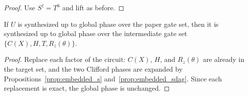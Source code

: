 \begin{proof}
  \leanok
  Use $S^\dagger = T^6$ and lift as before.
\end{proof}

\begin{theorem}
  \label{thm:clifford_rz_to_t_rz}
  \leanok
  If $U$ is synthesized up to global phase over the paper gate set, then it is
  synthesized up to global phase over the intermediate gate set
  $\{C(X), H, T, R_z(\theta)\}$.
\end{theorem}

\begin{proof}
  \leanok
  Replace each factor of the circuit: $C(X)$, $H$, and $R_z(\theta)$ are
  already in the target set, and the two Clifford phases are expanded by
  Propositions~\ref{prop:embedded_s} and~\ref{prop:embedded_sdag}.  Since each
  replacement is exact, the global phase is unchanged.
\end{proof}
